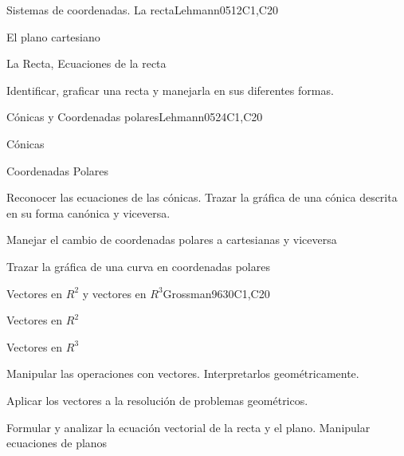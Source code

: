 \begin{syllabus}
\begin{unit}{}{Sistemas de coordenadas. La recta}{Lehmann05}{12}{C1,C20}
   \begin{topics}
      \item El plano cartesiano
      \item La Recta, Ecuaciones de la recta
   \end{topics}
   \begin{learningoutcomes}
      \item Identificar, graficar una recta y manejarla en sus diferentes formas.
   \end{learningoutcomes}
\end{unit}

\begin{unit}{}{Cónicas y Coordenadas polares}{Lehmann05}{24}{C1,C20}
   \begin{topics}
      \item Cónicas
      \item Coordenadas Polares
   \end{topics}

   \begin{learningoutcomes}
      \item Reconocer las ecuaciones de las cónicas. Trazar la gráfica de una cónica descrita en su forma canónica y viceversa.
      \item Manejar el cambio de coordenadas polares a cartesianas y viceversa
      \item Trazar la gráfica de una curva en coordenadas polares
      \end{learningoutcomes}
\end{unit}

\begin{unit}{}{Vectores en $R^2$ y vectores en $R^3$}{Grossman96}{30}{C1,C20}
   \begin{topics}
      \item Vectores en $R^2$
      \item Vectores en $R^3$
   \end{topics}

   \begin{learningoutcomes}
      \item Manipular las operaciones con vectores. Interpretarlos geométricamente.
      \item Aplicar los vectores a la resolución de problemas geométricos.
      \item Formular y analizar la ecuación vectorial de la recta y el plano. Manipular ecuaciones de planos
   \end{learningoutcomes}
\end{unit}



\begin{coursebibliography}
\end{coursebibliography}

\end{syllabus}
